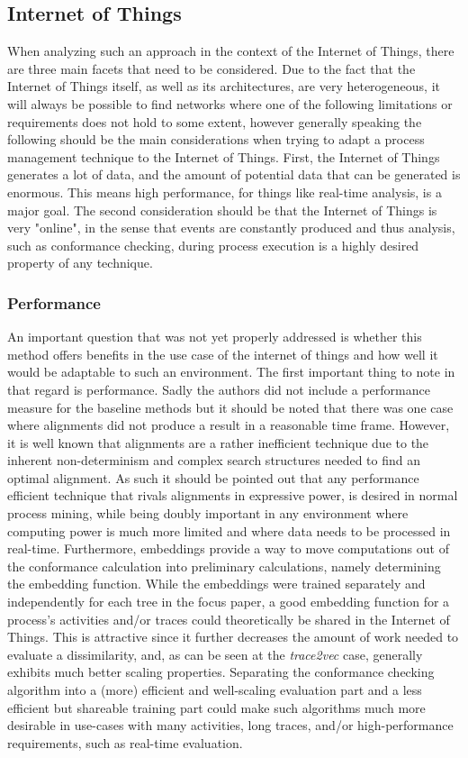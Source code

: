 \documentclass[runningheads]{template/llncs}
\begin{document}
\subsection{Internet of Things}
When analyzing such an approach in the context of the Internet of Things, there are three main facets that need to be considered.
Due to the fact that the Internet of Things itself, as well as its architectures, are very heterogeneous, it will always be possible to find networks where one of the following limitations or requirements does not hold to some extent, however generally speaking the following should be the main considerations when trying to adapt a process management technique to the Internet of Things.
First, the Internet of Things generates a lot of data, and the amount of potential data that can be generated is enormous.
This means high performance, for things like real-time analysis, is a major goal.
The second consideration should be that the Internet of Things is very "online", in the sense that events are constantly produced and thus analysis, such as conformance checking, during process execution is a highly desired property of any technique. 

\subsubsection{Performance}
An important question that was not yet properly addressed is whether this method offers benefits in the use case of the internet of things and how well it would be adaptable to such an environment.
The first important thing to note in that regard is performance.
Sadly the authors did not include a performance measure for the baseline methods but it should be noted that there was one case where alignments did not produce a result in a reasonable time frame. 
However, it is well known that alignments are a rather inefficient technique due to the inherent non-determinism and complex search structures needed to find an optimal alignment.
As such it should be pointed out that any performance efficient technique that rivals alignments in expressive power, is desired in normal process mining, while being doubly important in any environment where computing power is much more limited and where data needs to be processed in real-time.
Furthermore, embeddings provide a way to move computations out of the conformance calculation into preliminary calculations, namely determining the embedding function.
While the embeddings were trained separately and independently for each tree in the focus paper, a good embedding function for a process's activities and/or traces could theoretically be shared in the Internet of Things.
This is attractive since it further decreases the amount of work needed to evaluate a dissimilarity, and, as can be seen at the \emph{trace2vec} case, generally exhibits much better scaling properties.
Separating the conformance checking algorithm into a (more) efficient and well-scaling evaluation part and a less efficient but shareable training part could make such algorithms much more desirable in use-cases with many activities, long traces, and/or high-performance requirements, such as real-time evaluation.
\end{document}

